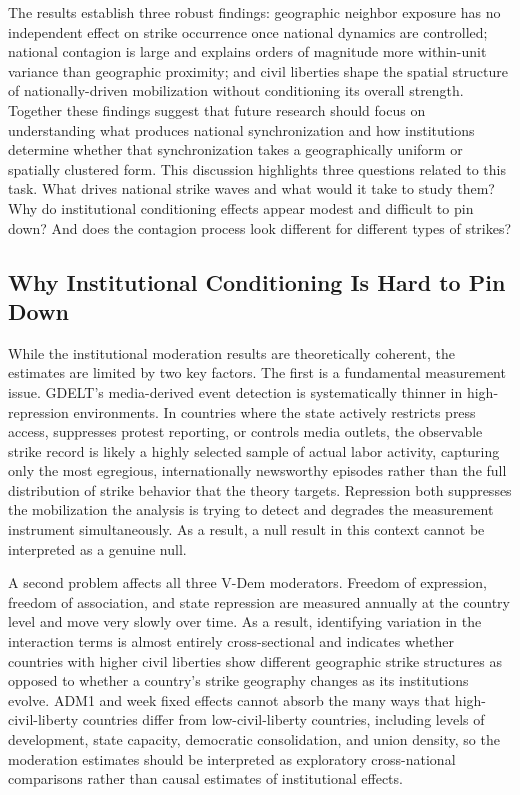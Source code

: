 \documentclass[
  11pt,
]{article}
\begin{document}
The results establish three robust findings: geographic neighbor
exposure has no independent effect on strike occurrence once national
dynamics are controlled; national contagion is large and explains orders
of magnitude more within-unit variance than geographic proximity; and
civil liberties shape the spatial structure of nationally-driven
mobilization without conditioning its overall strength. Together these
findings suggest that future research should focus on understanding what
produces national synchronization and how institutions determine whether
that synchronization takes a geographically uniform or spatially
clustered form. This discussion highlights three questions related to
this task. What drives national strike waves and what would it take to
study them? Why do institutional conditioning effects appear modest and
difficult to pin down? And does the contagion process look different for
different types of strikes?

\subsection{Why Institutional Conditioning Is Hard to Pin
Down}\label{why-institutional-conditioning-is-hard-to-pin-down}

While the institutional moderation results are theoretically coherent,
the estimates are limited by two key factors. The first is a fundamental
measurement issue. GDELT's media-derived event detection is
systematically thinner in high-repression environments. In countries
where the state actively restricts press access, suppresses protest
reporting, or controls media outlets, the observable strike record is
likely a highly selected sample of actual labor activity, capturing only
the most egregious, internationally newsworthy episodes rather than the
full distribution of strike behavior that the theory targets. Repression
both suppresses the mobilization the analysis is trying to detect and
degrades the measurement instrument simultaneously. As a result, a null
result in this context cannot be interpreted as a genuine null.

A second problem affects all three V-Dem moderators. Freedom of
expression, freedom of association, and state repression are measured
annually at the country level and move very slowly over time. As a
result, identifying variation in the interaction terms is almost
entirely cross-sectional and indicates whether countries with higher
civil liberties show different geographic strike structures as opposed
to whether a country's strike geography changes as its institutions
evolve. ADM1 and week fixed effects cannot absorb the many ways that
high-civil-liberty countries differ from low-civil-liberty countries,
including levels of development, state capacity, democratic
consolidation, and union density, so the moderation estimates should be
interpreted as exploratory cross-national comparisons rather than causal
estimates of institutional effects.
\end{document}
